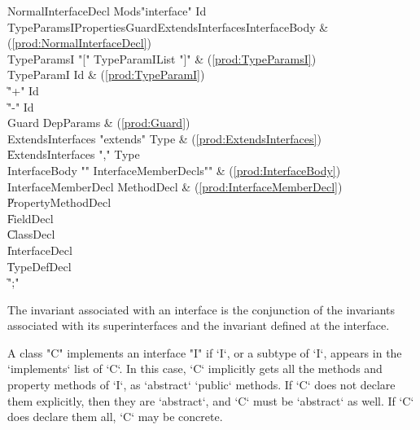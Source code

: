 \begin{bbgrammar}
 NormalInterfaceDecl \: Mods\opt \xcd"interface" Id TypeParamsI\opt Properties\opt Guard\opt ExtendsInterfaces\opt InterfaceBody & (\ref{prod:NormalInterfaceDecl}) \\
         TypeParamsI \: \xcd"[" TypeParamIList \xcd"]" & (\ref{prod:TypeParamsI}) \\
          TypeParamI \: Id & (\ref{prod:TypeParamI}) \\
                     \| \xcd"+" Id \\
                     \| \xcd"-" Id \\
               Guard \: DepParams & (\ref{prod:Guard}) \\
   ExtendsInterfaces \: \xcd"extends" Type & (\ref{prod:ExtendsInterfaces}) \\
                     \| ExtendsInterfaces \xcd"," Type \\
       InterfaceBody \: \xcd"{" InterfaceMemberDecls\opt \xcd"}" & (\ref{prod:InterfaceBody}) \\
 InterfaceMemberDecl \: MethodDecl & (\ref{prod:InterfaceMemberDecl}) \\
                     \| PropertyMethodDecl \\
                     \| FieldDecl \\
                     \| ClassDecl \\
                     \| InterfaceDecl \\
                     \| TypeDefDecl \\
                     \| \xcd";" \\
\end{bbgrammar}


\noindent
The invariant associated with an interface is the conjunction of the
invariants associated with its superinterfaces and the invariant
defined at the interface. 



A class \xcd"C"  implements an interface \xcd"I" if \xcd`I`, or a subtype of \xcd`I`, appears in the \xcd`implements` list
of \xcd`C`.  
In this case,
 \xcd`C` implicitly gets all the methods and property methods of \xcd`I`,
      as \xcd`abstract` \xcd`public` methods.  If \xcd`C` does not declare
      them explicitly, then they are \xcd`abstract`, and \xcd`C` must be
      \xcd`abstract` as well.   If \xcd`C` does declare them all, \xcd`C` may
      be concrete.



